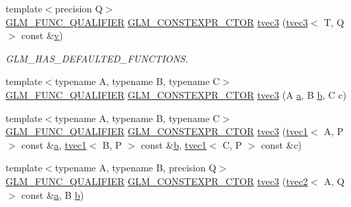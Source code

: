 \begin{DoxyCompactItemize}
\item 
{\footnotesize template$<$precision Q$>$ }\\\mbox{\hyperlink{setup_8hpp_a33fdea6f91c5f834105f7415e2a64407}{G\+L\+M\+\_\+\+F\+U\+N\+C\+\_\+\+Q\+U\+A\+L\+I\+F\+I\+ER}} \mbox{\hyperlink{setup_8hpp_ad34178a09666081abdb573c14d1f4a5a}{G\+L\+M\+\_\+\+C\+O\+N\+S\+T\+E\+X\+P\+R\+\_\+\+C\+T\+OR}} \mbox{\hyperlink{structglm_1_1tvec3_a60887256e89b9a7bb72e352171804e74}{tvec3}} (\mbox{\hyperlink{structglm_1_1tvec3}{tvec3}}$<$ T, Q $>$ const \&\mbox{\hyperlink{glad_8h_a14cfbe2fc2234f5504618905b69d1e06}{v}})
\begin{DoxyCompactList}\small\item\em G\+L\+M\+\_\+\+H\+A\+S\+\_\+\+D\+E\+F\+A\+U\+L\+T\+E\+D\+\_\+\+F\+U\+N\+C\+T\+I\+O\+NS. \end{DoxyCompactList}\item 
{\footnotesize template$<$typename A, typename B, typename C$>$ }\\\mbox{\hyperlink{setup_8hpp_a33fdea6f91c5f834105f7415e2a64407}{G\+L\+M\+\_\+\+F\+U\+N\+C\+\_\+\+Q\+U\+A\+L\+I\+F\+I\+ER}} \mbox{\hyperlink{setup_8hpp_ad34178a09666081abdb573c14d1f4a5a}{G\+L\+M\+\_\+\+C\+O\+N\+S\+T\+E\+X\+P\+R\+\_\+\+C\+T\+OR}} \mbox{\hyperlink{structglm_1_1tvec3_ae469956ac3e43086bb2f12c874448b32}{tvec3}} (A \mbox{\hyperlink{glad_8h_ac8729153468b5dcf13f971b21d84d4e5}{a}}, B \mbox{\hyperlink{glad_8h_a6eba317e3cf44d6d26c04a5a8f197dcb}{b}}, C c)
\item 
{\footnotesize template$<$typename A, typename B, typename C$>$ }\\\mbox{\hyperlink{setup_8hpp_a33fdea6f91c5f834105f7415e2a64407}{G\+L\+M\+\_\+\+F\+U\+N\+C\+\_\+\+Q\+U\+A\+L\+I\+F\+I\+ER}} \mbox{\hyperlink{setup_8hpp_ad34178a09666081abdb573c14d1f4a5a}{G\+L\+M\+\_\+\+C\+O\+N\+S\+T\+E\+X\+P\+R\+\_\+\+C\+T\+OR}} \mbox{\hyperlink{structglm_1_1tvec3_ac1b6201d66ed9b7ff28606cc73d020da}{tvec3}} (\mbox{\hyperlink{structglm_1_1tvec1}{tvec1}}$<$ A, P $>$ const \&\mbox{\hyperlink{glad_8h_ac8729153468b5dcf13f971b21d84d4e5}{a}}, \mbox{\hyperlink{structglm_1_1tvec1}{tvec1}}$<$ B, P $>$ const \&\mbox{\hyperlink{glad_8h_a6eba317e3cf44d6d26c04a5a8f197dcb}{b}}, \mbox{\hyperlink{structglm_1_1tvec1}{tvec1}}$<$ C, P $>$ const \&c)
\item 
{\footnotesize template$<$typename A, typename B, precision Q$>$ }\\\mbox{\hyperlink{setup_8hpp_a33fdea6f91c5f834105f7415e2a64407}{G\+L\+M\+\_\+\+F\+U\+N\+C\+\_\+\+Q\+U\+A\+L\+I\+F\+I\+ER}} \mbox{\hyperlink{setup_8hpp_ad34178a09666081abdb573c14d1f4a5a}{G\+L\+M\+\_\+\+C\+O\+N\+S\+T\+E\+X\+P\+R\+\_\+\+C\+T\+OR}} \mbox{\hyperlink{structglm_1_1tvec3_ae81af9e0d61ef8ed21994b9f824c4235}{tvec3}} (\mbox{\hyperlink{structglm_1_1tvec2}{tvec2}}$<$ A, Q $>$ const \&\mbox{\hyperlink{glad_8h_ac8729153468b5dcf13f971b21d84d4e5}{a}}, B \mbox{\hyperlink{glad_8h_a6eba317e3cf44d6d26c04a5a8f197dcb}{b}})

\end{DoxyCompactItemize}

